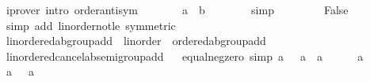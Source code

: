 \begin{isabellebody}
\ {\isacharparenleft}{\kern0pt}iprover\ intro{\isacharcolon}{\kern0pt}\ order{\isachardot}{\kern0pt}antisym{\isacharparenright}{\kern0pt}\isanewline
\ \ \ \ \isamarkupfalse%
\ \isamarkupfalse%
\ {\isachardoublequoteopen}a\ {\isacharequal}{\kern0pt}\ b{\isachardoublequoteclose}\isanewline
\ \ \ \ \ \ \isamarkupfalse%
\ simp\isanewline
\ \ \ \ \isamarkupfalse%
\ {\isacharasterisk}{\kern0pt}\ \isamarkupfalse%
\ False\isanewline
\ \ \ \ \ \ \isamarkupfalse%
\ {\isacharparenleft}{\kern0pt}simp\ add{\isacharcolon}{\kern0pt}\ linorder{\isacharunderscore}{\kern0pt}not{\isacharunderscore}{\kern0pt}le\ {\isacharbrackleft}{\kern0pt}symmetric{\isacharbrackright}{\kern0pt}{\isacharparenright}{\kern0pt}\isanewline
\ \ \isamarkupfalse%
\isanewline
{}\isamarkupfalse%
%
\endisatagproof
{\isafoldproof}%
%
\isadelimproof
\isanewline
%
\endisadelimproof
\isanewline
{}\isamarkupfalse%
\isanewline
\isanewline
{}\isamarkupfalse%
\ linordered{\isacharunderscore}{\kern0pt}ab{\isacharunderscore}{\kern0pt}group{\isacharunderscore}{\kern0pt}add\ {\isacharequal}{\kern0pt}\ linorder\ {\isacharplus}{\kern0pt}\ ordered{\isacharunderscore}{\kern0pt}ab{\isacharunderscore}{\kern0pt}group{\isacharunderscore}{\kern0pt}add\isanewline
{}\isanewline
\isanewline
{}\isamarkupfalse%
\ linordered{\isacharunderscore}{\kern0pt}cancel{\isacharunderscore}{\kern0pt}ab{\isacharunderscore}{\kern0pt}semigroup{\isacharunderscore}{\kern0pt}add%
\isadelimproof
\ %
\endisadelimproof
%
\isatagproof
\isacommand{{\isachardot}{\kern0pt}{\isachardot}{\kern0pt}}\isamarkupfalse%
%
\endisatagproof
{\isafoldproof}%
%
\isadelimproof
%
\endisadelimproof
\isanewline
\isanewline
{}\isamarkupfalse%
\ equal{\isacharunderscore}{\kern0pt}neg{\isacharunderscore}{\kern0pt}zero\ {\isacharbrackleft}{\kern0pt}simp{\isacharbrackright}{\kern0pt}{\isacharcolon}{\kern0pt}\ {\isachardoublequoteopen}a\ {\isacharequal}{\kern0pt}\ {\isacharminus}{\kern0pt}\ a\ {\isasymlongleftrightarrow}\ a\ {\isacharequal}{\kern0pt}\ {}{\isachardoublequoteclose}\isanewline
%
\isadelimproof
%
\endisadelimproof
%
\isatagproof
{}\isamarkupfalse%
\isanewline
\ \ \isamarkupfalse%
\ {\isachardoublequoteopen}a\ {\isacharequal}{\kern0pt}\ {}{\isachardoublequoteclose}\isanewline
\ \ \isamarkupfalse%
\ \isamarkupfalse%
\ {\isachardoublequoteopen}a\ {\isacharequal}{\kern0pt}\ {\isacharminus}{\kern0pt}\ a{\isachardoublequoteclose}\ \isamarkupfalse%

\end{isabellebody}
